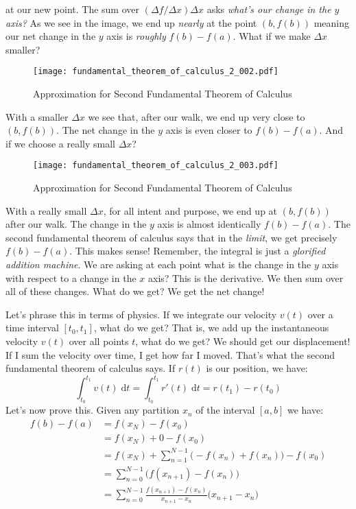 \documentclass{article}
\begin{document}
    at our new point. The sum over $(\Delta{f}/\Delta{x})\Delta{x}$ asks
    \textit{what's our change in the $y$ axis?} As we see in the image, we end up
    \textit{nearly} at the point $(b, f(b))$ meaning our net change in the $y$
    axis is \textit{roughly} $f(b)-f(a)$. What if we make $\Delta{x}$ smaller?
    \begin{figure}
        \centering
        \texttt{[image: fundamental\_theorem\_of\_calculus\_2\_002.pdf]}
        \caption{Approximation for Second Fundamental Theorem of Calculus}
    \end{figure}
    With a smaller $\Delta{x}$ we see that, after our walk, we end up very close
    to $(b,f(b))$. The net change in the $y$ axis is even closer to
    $f(b)-f(a)$. And if we choose a really small $\Delta{x}$?
    \begin{figure}
        \centering
        \texttt{[image: fundamental\_theorem\_of\_calculus\_2\_003.pdf]}
        \caption{Approximation for Second Fundamental Theorem of Calculus}
    \end{figure}
    With a really small $\Delta{x}$, for all intent and purpose, we end up
    at $(b,f(b))$ after our walk. The change in the $y$ axis is almost
    identically $f(b)-f(a)$. The second fundamental theorem of calculus says
    that in the \textit{limit}, we get precisely $f(b)-f(a)$. This makes sense!
    Remember, the integral is just a \textit{glorified addition machine}. We
    are asking at each point what is the change in the $y$ axis with respect to
    a change in the $x$ axis? This is the derivative. We then sum over all of
    these changes. What do we get? We get the net change!
    \par\hfill\par
    Let's phrase this in terms of physics. If we integrate our velocity $v(t)$
    over a time interval $[t_{0},t_{1}]$, what do we get? That is, we add up
    the instantaneous velocity $v(t)$ over all points $t$, what do we get?
    We should get our displacement! If I sum the velocity over time, I get how
    far I moved. That's what the second fundamental theorem of calculus says.
    If $r(t)$ is our position, we have:
    \begin{equation}
        \int_{t_{0}}^{t_{1}}v(t)\;\textrm{d}t
            =\int_{t_{0}}^{t_{1}}r'(t)\;\textrm{d}t
            =r(t_{1})-r(t_{0})
    \end{equation}
    Let's now prove this. Given any partition $x_{n}$ of the interval $[a,b]$
    we have:
    \begin{align}
        f(b)-f(a)
        &=f(x_{N})-f(x_{0})\\
        &=f(x_{N})+0-f(x_{0})\\
        &=f(x_{N})+\sum_{n=1}^{N-1}\Big(-f(x_{n})+f(x_{n})\Big)-f(x_{0})\\
        &=\sum_{n=0}^{N-1}\Big(f(x_{n+1})-f(x_{n})\Big)\\
        &=\sum_{n=0}^{N-1}\frac{f(x_{n+1})-f(x_{n})}{x_{n+1}-x_{n}}
            \big(x_{n+1}-x_{n}\big)
    \end{align}
\end{document}
